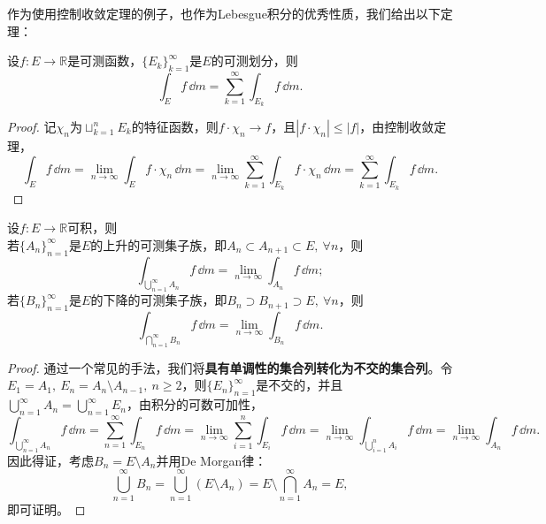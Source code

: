 作为使用控制收敛定理的例子，也作为Lebesgue积分的优秀性质，我们给出以下定理：
\begin{theorem}[Lebesgue积分的可数可加性]
    设$f:E\to\mathbb{R}$是可测函数，$\{E_k\}_{k=1}^{\infty}$是$E$的可测划分，则
    \begin{equation}
        \int_{E}f\,\dd m=\sum_{k=1}^{\infty}\int_{E_k}f\,\dd m.
    \end{equation}
\end{theorem}
\begin{proof}
    记$\chi_n$为$\sqcup_{k=1}^n E_k$的特征函数，则$f\cdot\chi_n\to f$，且$|f\cdot\chi_n|\leq |f|$，由控制收敛定理，
    \begin{equation}
        \int_{E}f\,\dd m=\lim_{n\to\infty}\int_{E}f\cdot\chi_n\,\dd m=\lim_{n\to\infty}\sum_{k=1}^{\infty}\int_{E_k}f\cdot\chi_n\,\dd m=\sum_{k=1}^{\infty}\int_{E_k}f\,\dd m.
    \end{equation}
\end{proof}
\begin{corollary}
    设$f:E\to\mathbb{R}$可积，则\\
     若$\{A_n\}_{n=1}^{\infty}$是$E$的上升的可测集子族，即$A_n\subset A_{n+1}\subset E,\ \forall n$，则
    \begin{equation}
        \int_{\bigcup_{n=1}^{\infty}A_n}f\,\dd m=\lim_{n\to\infty}\int_{A_n}f\,\dd m;
    \end{equation}
     若$\{B_n\}_{n=1}^{\infty}$是$E$的下降的可测集子族，即$B_n\supset B_{n+1}\supset E,\ \forall n$，则
    \begin{equation}
        \int_{\bigcap_{n=1}^{\infty}B_n}f\,\dd m=\lim_{n\to\infty}\int_{B_n}f\,\dd m.
    \end{equation}
\end{corollary}
\begin{proof}
    通过一个常见的手法，我们将\textbf{具有单调性的集合列转化为不交的集合列}。令$E_1=A_1,\ E_n=A_n\setminus A_{n-1},\ n\geq 2$，则$\{E_n\}_{n=1}^{\infty}$是不交的，并且$\bigcup_{n=1}^{\infty}A_n=\bigcup_{n=1}^{\infty}E_n$，由积分的可数可加性，
    \begin{equation}
        \int_{\bigcup_{n=1}^{\infty}A_n}f\,\dd m=\sum_{n=1}^{\infty}\int_{E_n}f\,\dd m=\lim_{n\to\infty}\sum_{i=1}^{n}\int_{E_i}f\,\dd m=\lim_{n\to\infty}\int_{\bigcup_{i=1}^{n}A_i}f\,\dd m=\lim_{n\to\infty}\int_{A_n}f\,\dd m.
    \end{equation}
    因此得证，考虑$B_n=E\setminus A_n$并用De Morgan律：
    \begin{equation}
        \bigcup_{n=1}^{\infty}B_n=\bigcup_{n=1}^{\infty}(E\setminus A_n)=E\setminus \bigcap_{n=1}^{\infty}A_n=E,
    \end{equation}
    即可证明。
\end{proof}

